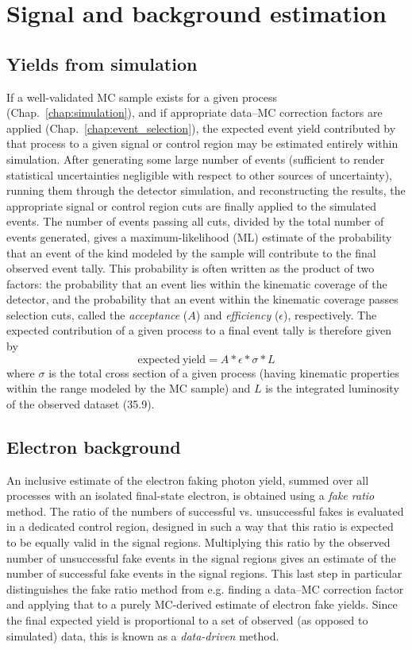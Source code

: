 \chapter{Signal and background estimation} \label{chap:background_estimation}
\section{Yields from simulation} \label{sec:background_estimation_simulated}
If a well-validated MC sample exists for a given process (Chap.~\ref{chap:simulation}), and if appropriate data--MC correction factors are applied (Chap.~\ref{chap:event_selection}),
the expected event yield contributed by that process to a given signal or control region may be estimated entirely within simulation.
After generating some large number of events (sufficient to render statistical uncertainties negligible with respect to other sources of uncertainty),
running them through the detector simulation, and reconstructing the results, the appropriate signal or control region cuts are finally applied to the simulated events.
The number of events passing all cuts, divided by the total number of events generated, gives a maximum-likelihood (ML) estimate of the probability that
an event of the kind modeled by the sample will contribute to the final observed event tally. This probability is often written as the product of two factors: the
probability that an event lies within the kinematic coverage of the detector, and the probability that an event within the kinematic coverage passes selection cuts,
called the \textit{acceptance} ($A$) and \textit{efficiency} ($\epsilon$), respectively. The expected contribution of a given process to a final event tally is therefore given by
\begin{equation}
\mathrm{expected\ yield} = A*\epsilon*\sigma*L
\end{equation}
where $\sigma$ is the total cross section of a given process (having kinematic properties within the range modeled by the MC sample) and $L$ is the integrated
luminosity of the observed dataset (35.9\fbinv).

\section{Electron background} \label{sec:background_estimation_elefake}
An inclusive estimate of the electron faking photon yield, summed over all processes with an isolated final-state electron, is obtained using a \textit{fake ratio} method.
The ratio of the numbers of successful vs. unsuccessful fakes is evaluated in a dedicated control region, designed in such a way that this ratio is expected to be equally
valid in the signal regions. Multiplying this ratio by the observed number of unsuccessful fake events in the signal regions gives an estimate of the number of successful
fake events in the signal regions. This last step in particular distinguishes the fake ratio method from e.g. finding a data--MC correction factor and applying that to
a purely MC-derived estimate of electron fake yields. Since the final expected yield is proportional to a set of observed (as opposed to simulated) data,
this is known as a \textit{data-driven} method.

